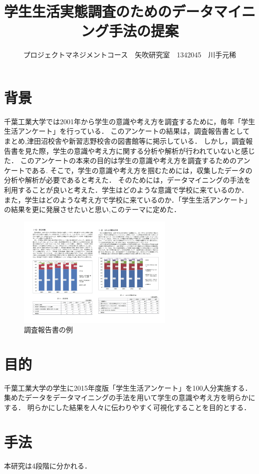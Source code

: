 \documentclass[uplatex,twocolumn,dvipdfmx]{jsarticle}
\title{\vspace{-5mm}\fontsize{14pt}{0pt}\selectfont 学生生活実態調査のためのデータマイニング手法の提案}
\author{\normalsize プロジェクトマネジメントコース　矢吹研究室　1342045　川手元稀}
\date{}
\begin{document}
\fontsize{10.5pt}{\baselineskip}\selectfont
\maketitle





\section{背景}
千葉工業大学では2001年から学生の意識や考え方を調査するために，毎年「学生生活アンケート」を行っている．
このアンケートの結果は，調査報告書としてまとめ,津田沼校舎や新習志野校舎の図書館等に掲示している．
しかし，調査報告書を見た際，学生の意識や考え方に関する分析や解析が行われていないと感じた．
このアンケートの本来の目的は学生の意識や考え方を調査するためのアンケートである\cite{a}.
そこで，学生の意識や考え方を掴むためには，収集したデータの分析や解析が必要であると考えた．
そのためには，データマイニングの手法を利用することが良いと考えた．学生はどのような意識で学校に来ているのか．
また，学生はどのような考え方で学校に来ているのか．「学生生活アンケート」の結果を更に発展させたいと思い,このテーマに定めた．


\begin{figure}[htbp]
  \includegraphics[width=7.5cm]{questionnairesurvey.pdf}
\caption{調査報告書の例}\label{調査報告書}
\end{figure}

\section{目的}
千葉工業大学の学生に2015年度版「学生生活アンケート」を100人分実施する．集めたデータをデータマイニングの手法を用いて学生の意識や考え方を明らかにする．
明らかにした結果を人々に伝わりやすく可視化することを目的とする．

\section{手法}
本研究は4段階に分かれる．
\end{document}
